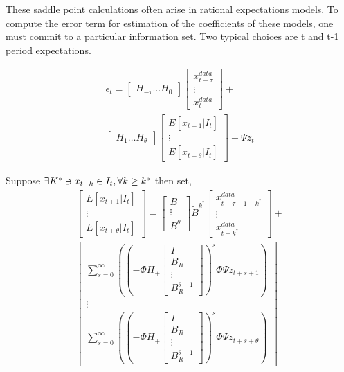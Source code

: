 \documentclass{article}
\begin{document}
{These saddle point calculations often arise in rational expectations models.
To compute the error term for estimation of the coefficients of these models,
one must commit to a particular information set.
Two typical choices are t and t-1 period expectations.


\begin{multline*}
  \epsilon_t =
  \begin{bmatrix}
    H_{-\tau}\ldots H_0
  \end{bmatrix} 
  \begin{bmatrix}
    x^{data}_{t-\tau}\\
\vdots \\ 
   x^{data}_{t}
  \end{bmatrix} +\\
  \begin{bmatrix}
    H_{1}\ldots H_\theta
  \end{bmatrix} 
  \begin{bmatrix}
    E [x_{t+1} |I_t] \\
\vdots \\
    E [x_{t+\theta}|I_t]
  \end{bmatrix} - \Psi z_t
\end{multline*}

Suppose 
$\exists K^\ast \ni x_{t-k} \in I_t, \forall k \ge k^\ast\\$ then set,
\begin{gather*}
    \begin{bmatrix}
    E [x_{t+1} |I_t] \\
\vdots \\
    E [x_{t+\theta}|I_t]
  \end{bmatrix}  =
\begin{bmatrix}
      B\\\vdots\\B^\theta
    \end{bmatrix}
 \tilde{B}^{k^\ast}
  \begin{bmatrix}
    x^{data}_{t-\tau+1-k^\ast}\\
\vdots \\ 
   x^{data}_{t-k^\ast}
  \end{bmatrix} +\\
  \begin{bmatrix}
\sum_{s=0}^\infty ( (-\Phi H_+\begin{bmatrix}
I\\B_R\\\vdots\\B^{\theta-1}_R
  \end{bmatrix})^{s} \Phi\Psi z_{t+s+1})\\
  \vdots\\
\sum_{s=0}^\infty ( (-\Phi H_+\begin{bmatrix}
I\\B_R\\\vdots\\B^{\theta-1}_R
  \end{bmatrix})^{s} \Phi\Psi z_{t+s+\theta})
  \end{bmatrix}
\end{gather*}

}
\end{document}
